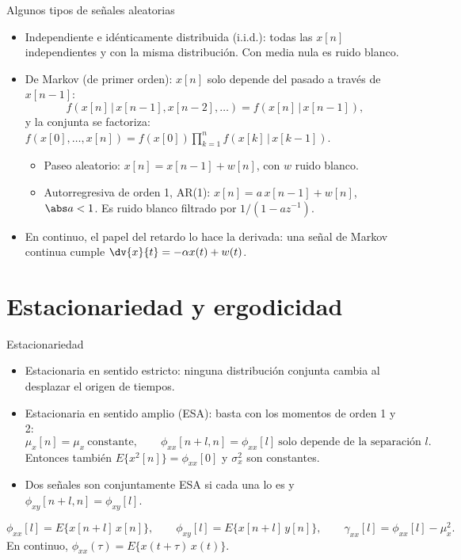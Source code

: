 \documentclass[aspectratio=169,11pt]{beamer}
\begin{document}
\begin{frame}{Algunos tipos de señales aleatorias}
  \small
  \begin{itemize}
    \item \alert{Independiente e idénticamente distribuida} (i.i.d.): todas las $x[n]$ independientes y con la misma distribución. Con media nula es \alert{ruido blanco}.
    \item \alert{De Markov} (de primer orden): $x[n]$ solo depende del pasado a través de $x[n-1]$:
    \[
      f(x[n]\,|\,x[n-1],x[n-2],\dots)=f(x[n]\,|\,x[n-1]),
    \]
    y la conjunta se factoriza: $f(x[0],\dots,x[n])=f(x[0])\prod_{k=1}^nf(x[k]\,|\,x[k-1])$.
    \begin{itemize}
      \item Paseo aleatorio: $x[n]=x[n-1]+w[n]$, con $w$ ruido blanco.
      \item Autorregresiva de orden 1, AR(1): $x[n]=a\,x[n-1]+w[n]$, $\abs a<1$. Es ruido blanco filtrado por $1/(1-az^{-1})$.
    \end{itemize}
    \item En continuo, el papel del retardo lo hace la derivada: una señal de Markov continua cumple $\dv{x}{t}=-\alpha x(t)+w(t)$.
  \end{itemize}
\end{frame}

\section{Estacionariedad y ergodicidad}

\begin{frame}{Estacionariedad}
  \small
  \begin{itemize}
    \item \alert{Estacionaria en sentido estricto}: ninguna distribución conjunta cambia al desplazar el origen de tiempos.
    \item \alert{Estacionaria en sentido amplio} (ESA): basta con los momentos de orden 1 y 2:
    \[
      \mu_x[n]=\mu_x\ \text{constante},\qquad\phi_{xx}[n+l,n]=\phi_{xx}[l]\ \text{solo depende de la separación }l.
    \]
    Entonces también $E\{x^2[n]\}=\phi_{xx}[0]$ y $\sigma_x^2$ son constantes.
    \item Dos señales son \alert{conjuntamente ESA} si cada una lo es y $\phi_{xy}[n+l,n]=\phi_{xy}[l]$.
  \end{itemize}
  \begin{definicion}
    \[
      \phi_{xx}[l]=E\{x[n+l]\,x[n]\},\qquad\phi_{xy}[l]=E\{x[n+l]\,y[n]\},\qquad\gamma_{xx}[l]=\phi_{xx}[l]-\mu_x^2 .
    \]
    En continuo, $\phi_{xx}(\tau)=E\{x(t+\tau)\,x(t)\}$.
  \end{definicion}
\end{frame}
\end{document}
